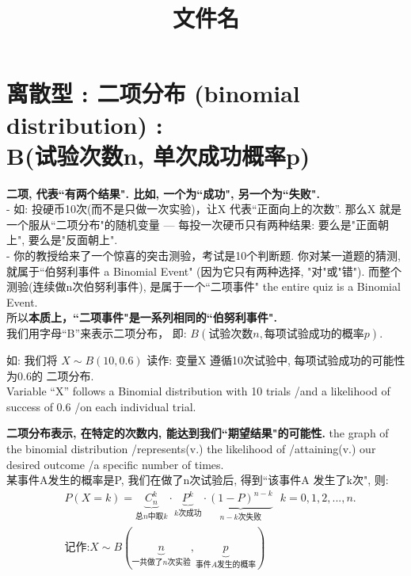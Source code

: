 \documentclass[UTF8]{ctexart}
\title{文件名}
\begin{document}
	\tableofcontents %
	\date{} %
	\maketitle  %
	
	
	\section{离散型 : 二项分布 (binomial distribution) : \\ B(试验次数n, 单次成功概率p)}
	
		
	
	\textbf{二项, 代表``有两个结果". 比如, 一个为``成功", 另一个为``失败".} \\	
	
	- 如: 投硬币10次(而不是只做一次实验)，让X 代表``正面向上的次数”. 那么X 就是一个服从``二项分布"的随机变量 --- 每投一次硬币只有两种结果: 要么是"正面朝上", 要么是"反面朝上". \\
	- 你的教授给来了一个惊喜的突击测验，考试是10个判断题. 你对某一道题的猜测, 就属于``伯努利事件 a Binomial Event"  (因为它只有两种选择, "对"或"错"). 而整个测验(连续做n次伯努利事件), 是属于一个``二项事件" the entire quiz is a Binomial Event. \\
	
	所以\textbf{本质上，``二项事件"是一系列相同的``伯努利事件".} \\
	
	我们用字母``B”来表示二项分布， 即: $\boxed{B(\text{试验次数}n, \text{每项试验成功的概率}p)}$. \\
	
	\begin{myEnvSample}
		如: 我们将 $X \sim B(10, 0.6)$ 读作: 变量X 遵循10次试验中, 每项试验成功的可能性为0.6的 二项分布. \\
		Variable “X” follows a Binomial distribution with 10 trials /and a likelihood of success of 0.6 /on each individual trial. 
	\end{myEnvSample}

	\textbf{二项分布表示, 在特定的次数内, 能达到我们``期望结果"的可能性.} the graph of the binomial distribution /represents(v.) the likelihood of /attaining(v.) our desired outcome /a specific number of times. \\


某事件A发生的概率是P, 我们在做了n次试验后, 得到``该事件A 发生了k次", 则: 
\begin{align*}  %
	&P\left( X=k \right) =\underset{\text{总}n\text{中取}k}{\underbrace{C_{n}^{k}}}\cdot \underset{k\text{次成功}}{\underbrace{P^k}}\cdot \underset{n-k\text{次失败}}{\underbrace{\left( 1-P \right) ^{n-k}}}\ \ \ k=0,1,2,...,n.\\
&\text{记作:}X \sim B\left( \underset{\text{一共做了}n\text{次实验}}{\underbrace{n}},\underset{\text{事件}A\text{发生的概率}}{\underbrace{p}} \right)
\end{align*}
\vspace{1em} 
\end{document}
